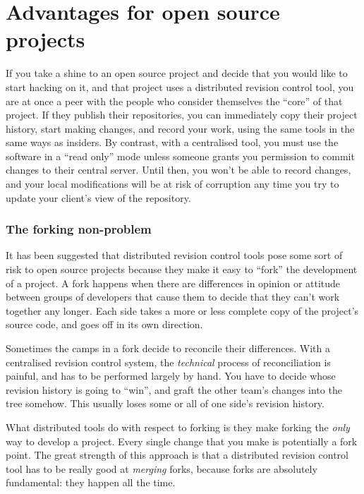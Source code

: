 \section{Advantages for open source projects}

If you take a shine to an open source project and decide that you
would like to start hacking on it, and that project uses a distributed
revision control tool, you are at once a peer with the people who
consider themselves the ``core'' of that project.  If they publish
their repositories, you can immediately copy their project history,
start making changes, and record your work, using the same tools in
the same ways as insiders.  By contrast, with a centralised tool, you
must use the software in a ``read only'' mode unless someone grants
you permission to commit changes to their central server.  Until then,
you won't be able to record changes, and your local modifications will
be at risk of corruption any time you try to update your client's view
of the repository.

\subsubsection{The forking non-problem}

It has been suggested that distributed revision control tools pose
some sort of risk to open source projects because they make it easy to
``fork'' the development of a project.  A fork happens when there are
differences in opinion or attitude between groups of developers that
cause them to decide that they can't work together any longer.  Each
side takes a more or less complete copy of the project's source code,
and goes off in its own direction.

Sometimes the camps in a fork decide to reconcile their differences.
With a centralised revision control system, the \emph{technical}
process of reconciliation is painful, and has to be performed largely
by hand.  You have to decide whose revision history is going to
``win'', and graft the other team's changes into the tree somehow.
This usually loses some or all of one side's revision history.

What distributed tools do with respect to forking is they make forking
the \emph{only} way to develop a project.  Every single change that
you make is potentially a fork point.  The great strength of this
approach is that a distributed revision control tool has to be really
good at \emph{merging} forks, because forks are absolutely
fundamental: they happen all the time.  

